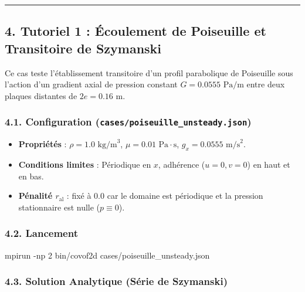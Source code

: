 \documentclass[
  french,
]{article}
\newenvironment{Shaded}{}{}
\newcommand{\AttributeTok}[1]{\textcolor[rgb]{0.49,0.56,0.16}{#1}}
\newcommand{\ExtensionTok}[1]{#1}
\newcommand{\NormalTok}[1]{#1}
\providecommand{\tightlist}{%
  \setlength{\itemsep}{0pt}\setlength{\parskip}{0pt}}
\begin{document}
\begin{center}\rule{0.5\linewidth}{0.5pt}\end{center}

\subsection{4. Tutoriel 1 : Écoulement de Poiseuille et Transitoire de
Szymanski}\label{tutoriel-1-uxe9coulement-de-poiseuille-et-transitoire-de-szymanski}

Ce cas teste l'établissement transitoire d'un profil parabolique de
Poiseuille sous l'action d'un gradient axial de pression constant
\(G = 0.0555\text{ Pa/m}\) entre deux plaques distantes de
\(2e = 0.16\text{ m}\).

\subsubsection{\texorpdfstring{4.1. Configuration
(\texttt{cases/poiseuille\_unsteady.json})}{4.1. Configuration (cases/poiseuille\_unsteady.json)}}\label{configuration-casespoiseuille_unsteady.json}

\begin{itemize}
\tightlist
\item
  \textbf{Propriétés} : \(\rho = 1.0\text{ kg/m}^3\),
  \(\mu = 0.01\text{ Pa}\cdot\text{s}\), \(g_x = 0.0555\text{ m/s}^2\).
\item
  \textbf{Conditions limites} : Périodique en \(x\), adhérence
  (\(u=0, v=0\)) en haut et en bas.
\item
  \textbf{Pénalité \(r_{\text{al}}\)} : fixé à \(0.0\) car le domaine
  est périodique et la pression stationnaire est nulle (\(p \equiv 0\)).
\end{itemize}

\subsubsection{4.2. Lancement}\label{lancement}

\begin{Shaded}
\begin{Highlighting}[]
\ExtensionTok{mpirun} \AttributeTok{{-}np}\NormalTok{ 2 bin/covof2d cases/poiseuille\_unsteady.json}
\end{Highlighting}
\end{Shaded}

\subsubsection{4.3. Solution Analytique (Série de
Szymanski)}\label{solution-analytique-suxe9rie-de-szymanski}
\end{document}
